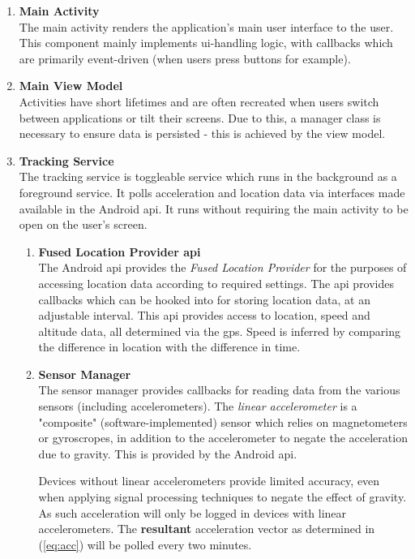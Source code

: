 \begin{enumerate}
\item \textbf{Main Activity}\\
The main activity renders the application's main user interface to the user.
This component mainly implements \Ac{ui}-handling logic, with callbacks which are primarily event-driven (when users press buttons for example).
\item \textbf{Main View Model}\\
Activities have short lifetimes and are often recreated when users switch between applications or tilt their screens.
Due to this, a manager class is necessary to ensure data is persisted - this is achieved by the view model.
\item \textbf{Tracking Service}\\
The tracking service is toggleable service which runs in the background as a foreground service.
It polls acceleration and location data via interfaces made available in the Android \ac{api}.
It runs without requiring the main activity to be open on the user's screen.
\begin{enumerate}
\item \textbf{Fused Location Provider \ac{api}}\\
The Android \ac{api} provides the \textit{Fused Location Provider} for the purposes of accessing location data according to required settings.
The \ac{api} provides callbacks which can be hooked into for storing location data, at an adjustable interval.
This \ac{api} provides access to location, speed and altitude data, all determined via the \ac{gps}.
Speed is inferred by comparing the difference in location with the difference in time.
\item \textbf{Sensor Manager}\\
The sensor manager provides callbacks for reading data from the various sensors (including accelerometers).
The \textit{linear accelerometer} is a "composite" (software-implemented) sensor which relies on magnetometers or gyroscropes, in addition to the accelerometer to negate the acceleration due to gravity.
This is provided by the Android \ac{api}.

Devices without linear accelerometers provide limited accuracy, even when applying signal processing techniques to negate the effect of gravity.
As such acceleration will only be logged in devices with linear accelerometers.
The \textbf{resultant} acceleration vector as determined in (\ref{eq:acc}) will be polled every two minutes.
\end{enumerate}


\end{enumerate}
